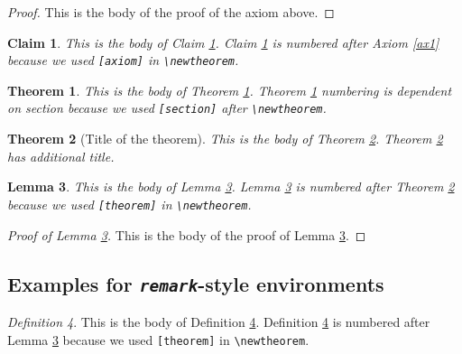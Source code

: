 \documentclass[aoas]{imsart}
\numberwithin{equation}{section}
\theoremstyle{plain}
\newtheorem{claim}[axiom]{Claim}
\newtheorem{theorem}{Theorem}[section]
\newtheorem{lemma}[theorem]{Lemma}
\theoremstyle{remark}
\newtheorem{definition}[theorem]{Definition}
\begin{document}
\begin{proof}
This is the body of the proof of the axiom above.

\end{proof}

\begin{claim}
\label{cl1} This is the body of Claim \ref{cl1}. Claim \ref{cl1} is
numbered after Axiom \ref{ax1} because we used \verb|[axiom]| in
\verb|\newtheorem|.

\end{claim}

\begin{theorem}
\label{th1} This is the body of Theorem \ref{th1}. Theorem \ref{th1}
numbering is dependent on section because we used \verb|[section]| after
\verb|\newtheorem|.

\end{theorem}

\begin{theorem}[Title of the theorem]
\label{th2} This is the body of Theorem \ref{th2}. Theorem \ref{th2} has
additional title.

\end{theorem}

\begin{lemma}
\label{le1} This is the body of Lemma \ref{le1}. Lemma \ref{le1} is
numbered after Theorem \ref{th2} because we used \verb|[theorem]| in
\verb|\newtheorem|.

\end{lemma}

\begin{proof}[Proof of Lemma \ref{le1}]
This is the body of the proof of Lemma \ref{le1}.

\end{proof}

\hypertarget{examples-for-remark-style-environments}{%
\subsection{\texorpdfstring{Examples for \emph{\texttt{remark}}-style
environments}{Examples for remark-style environments}}\label{examples-for-remark-style-environments}}

\begin{definition}
\label{de1} This is the body of Definition \ref{de1}. Definition
\ref{de1} is numbered after Lemma \ref{le1} because we used
\verb|[theorem]| in \verb|\newtheorem|.

\end{definition}
\end{document}
